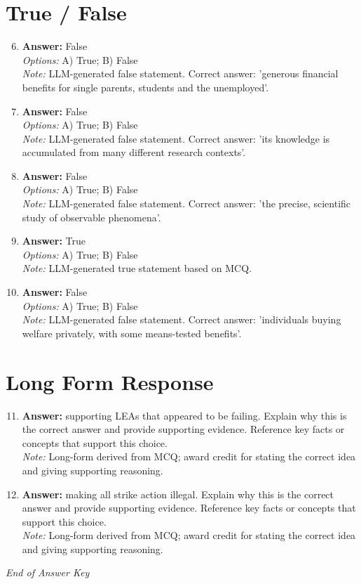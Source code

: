 \documentclass[12pt]{article}
\begin{document}
\section*{True / False}
\begin{enumerate}[label=\arabic*.]
\setcounter{enumi}{5}
\item \textbf{Answer:} False
\\ \textit{Options:} A) True; B) False
\\ \textit{Note:} LLM-generated false statement. Correct answer: 'generous financial benefits for single parents, students and the unemployed'.
\item \textbf{Answer:} False
\\ \textit{Options:} A) True; B) False
\\ \textit{Note:} LLM-generated false statement. Correct answer: 'its knowledge is accumulated from many different research contexts'.
\item \textbf{Answer:} False
\\ \textit{Options:} A) True; B) False
\\ \textit{Note:} LLM-generated false statement. Correct answer: 'the precise, scientific study of observable phenomena'.
\item \textbf{Answer:} True
\\ \textit{Options:} A) True; B) False
\\ \textit{Note:} LLM-generated true statement based on MCQ.
\item \textbf{Answer:} False
\\ \textit{Options:} A) True; B) False
\\ \textit{Note:} LLM-generated false statement. Correct answer: 'individuals buying welfare privately, with some means-tested benefits'.
\end{enumerate}

\section*{Long Form Response}
\begin{enumerate}[label=\arabic*.]
\setcounter{enumi}{10}
\item \textbf{Answer:} supporting LEAs that appeared to be failing. Explain why this is the correct answer and provide supporting evidence. Reference key facts or concepts that support this choice.
\\ \textit{Note:} Long-form derived from MCQ; award credit for stating the correct idea and giving supporting reasoning.
\item \textbf{Answer:} making all strike action illegal. Explain why this is the correct answer and provide supporting evidence. Reference key facts or concepts that support this choice.
\\ \textit{Note:} Long-form derived from MCQ; award credit for stating the correct idea and giving supporting reasoning.
\end{enumerate}

\vfill
\noindent\textit{End of Answer Key}
\end{document}
